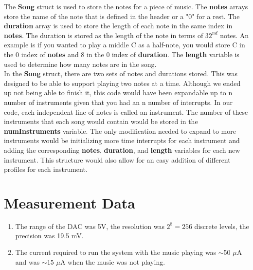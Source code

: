 \documentclass{article}
\begin{document}
	The \textbf{Song} struct is used to store the notes for a piece of music. The \textbf{notes} arrays store the name of the note that is defined in the header or a "0" for a rest. The \textbf{duration} array is used to store the length of each note in the same index in \textbf{notes}. The duration is stored as the length of the note in terms of $32^{nd}$ notes. An example is if you wanted to play a middle C as a half-note, you would store C in the 0 index of \textbf{notes} and 8 in the 0 index of \textbf{duration}. The \textbf{length} variable is used to determine how many notes are in the song.\\
	In the \textbf{Song} struct, there are two sets of notes and durations stored. This was designed to be able to support playing two notes at a time. Although we ended up not being able to finish it, this code would have been expandable up to n number of instruments given that you had an n number of interrupts. In our code, each independent line of notes is called an instrument. The number of these instruments that each song would contain would be stored in the \textbf{numInstruments} variable. The only modification needed to expand to more instruments would be initializing more time interrupts for each instrument and adding the corresponding \textbf{notes}, \textbf{duration}, and \textbf{length} variables for each new instrument. This structure would also allow for an easy addition of different profiles for each instrument.

\section{Measurement Data}
\begin{enumerate}
	\item
		The range of the DAC was 5V, the resolution was $2^8 = 256$ discrete levels, the precision was 19.5 mV.
	\item
		The current required to run the system with the music playing was $\sim$50 $\mu$A and was $\sim$15 $\mu$A when the music was not playing.
\end{enumerate}

\end{document}
